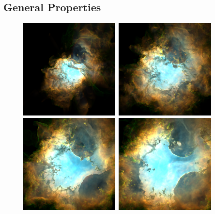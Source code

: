 \documentclass[useAMS,usenatbib]{mn2e}
\begin{document}
\subsection{General Properties}
\label{subsec:genprop}
\begin{figure}
\centering
\includegraphics[width=0.45\textwidth]{emission-image-15}~\includegraphics[width=0.45\textwidth]{emission-image-20}\\
\includegraphics[width=0.45\textwidth]{emission-image-25}~\includegraphics[width=0.45\textwidth]{emission-image-30}

\end{figure}
\end{document}
